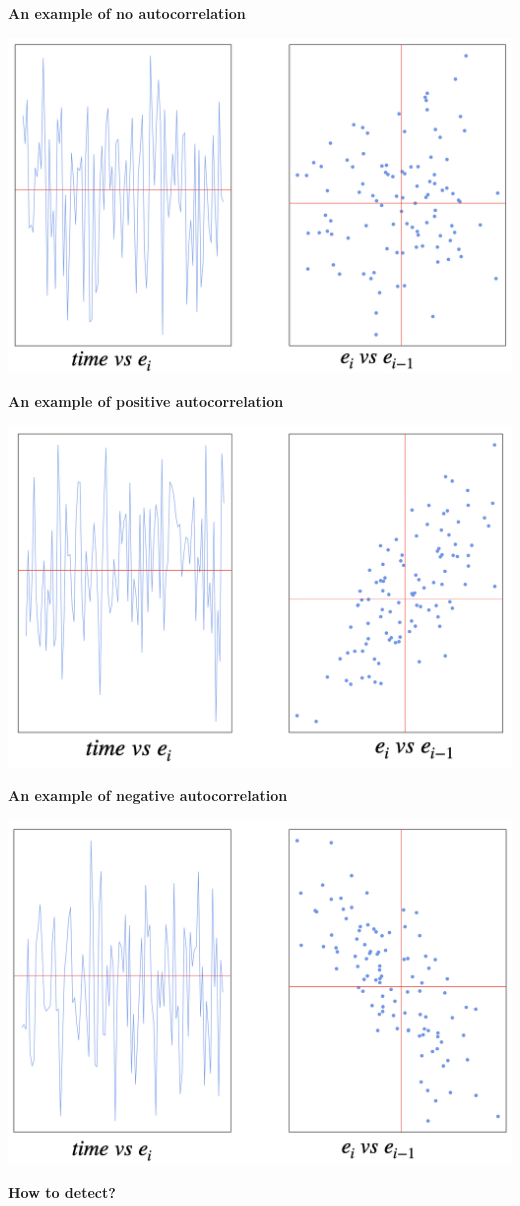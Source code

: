 \documentclass[
]{article}
\begin{document}
\textbf{An example of no autocorrelation}

\begin{center}\includegraphics[width=0.6\linewidth,height=0.6\textheight]{figures/ass10} \end{center}

\textbf{An example of positive autocorrelation}

\begin{center}\includegraphics[width=0.6\linewidth,height=0.6\textheight]{figures/ass8} \end{center}

\textbf{An example of negative autocorrelation}

\begin{center}\includegraphics[width=0.6\linewidth,height=0.6\textheight]{figures/ass9} \end{center}

\textbf{How to detect?}
\end{document}

